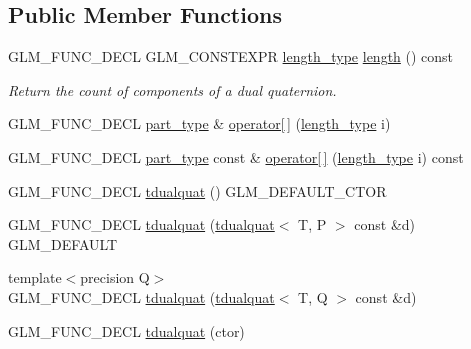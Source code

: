 \subsection*{Public Member Functions}
\begin{DoxyCompactItemize}
\item 
G\+L\+M\+\_\+\+F\+U\+N\+C\+\_\+\+D\+E\+C\+L G\+L\+M\+\_\+\+C\+O\+N\+S\+T\+E\+X\+P\+R \hyperlink{structglm_1_1tdualquat_a8100706ca94a1aa6611874787a9be0ca}{length\+\_\+type} \hyperlink{structglm_1_1tdualquat_aeb129f4d453971e3ede24b9cdd51e316}{length} () const 
\begin{DoxyCompactList}\small\item\em Return the count of components of a dual quaternion. \end{DoxyCompactList}\item 
G\+L\+M\+\_\+\+F\+U\+N\+C\+\_\+\+D\+E\+C\+L \hyperlink{structglm_1_1tdualquat_a496a3e08262a28863cf7b0609eee7e5b}{part\+\_\+type} \& \hyperlink{structglm_1_1tdualquat_a249f53dd1ed32db9b6695b10e89de1f6}{operator\mbox{[}$\,$\mbox{]}} (\hyperlink{structglm_1_1tdualquat_a8100706ca94a1aa6611874787a9be0ca}{length\+\_\+type} i)
\item 
G\+L\+M\+\_\+\+F\+U\+N\+C\+\_\+\+D\+E\+C\+L \hyperlink{structglm_1_1tdualquat_a496a3e08262a28863cf7b0609eee7e5b}{part\+\_\+type} const \& \hyperlink{structglm_1_1tdualquat_a4a4f39b47dcdc02a6aee3f70a0021d74}{operator\mbox{[}$\,$\mbox{]}} (\hyperlink{structglm_1_1tdualquat_a8100706ca94a1aa6611874787a9be0ca}{length\+\_\+type} i) const 
\item 
G\+L\+M\+\_\+\+F\+U\+N\+C\+\_\+\+D\+E\+C\+L \hyperlink{structglm_1_1tdualquat_a1101ba51890cb5bb968d937c7234fcb8}{tdualquat} () G\+L\+M\+\_\+\+D\+E\+F\+A\+U\+L\+T\+\_\+\+C\+T\+O\+R
\item 
G\+L\+M\+\_\+\+F\+U\+N\+C\+\_\+\+D\+E\+C\+L \hyperlink{structglm_1_1tdualquat_a75865e78ae0e0d64b894b3893f9c5463}{tdualquat} (\hyperlink{structglm_1_1tdualquat}{tdualquat}$<$ T, P $>$ const \&d) G\+L\+M\+\_\+\+D\+E\+F\+A\+U\+L\+T
\item 
{\footnotesize template$<$precision Q$>$ }\\G\+L\+M\+\_\+\+F\+U\+N\+C\+\_\+\+D\+E\+C\+L \hyperlink{structglm_1_1tdualquat_a30d62fb2234586d3f2d96a2c88794afd}{tdualquat} (\hyperlink{structglm_1_1tdualquat}{tdualquat}$<$ T, Q $>$ const \&d)
\item 
G\+L\+M\+\_\+\+F\+U\+N\+C\+\_\+\+D\+E\+C\+L \hyperlink{structglm_1_1tdualquat_af369c77b15edc85fa3dcfb6707de98b0}{tdualquat} (ctor)
\item 

\end{DoxyCompactItemize}
